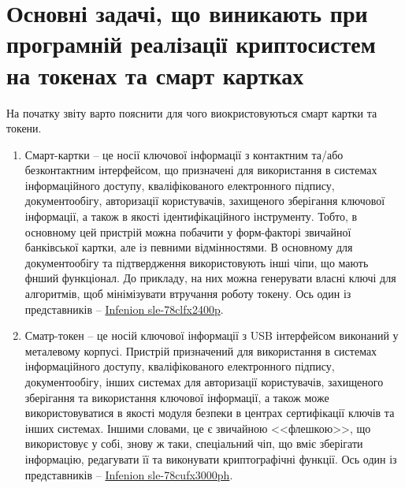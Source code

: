 


\chapter{Основні задачі, що виникають при програмній реалізації криптосистем на токенах та смарт картках}

На початку звіту варто пояснити для чого виокристовуються смарт картки та токени.
\begin{enumerate}
    \item Смарт-картки -- це носії ключової інформації з контактним та/або безконтактним інтерфейсом, що призначені для використання в системах інформаційного доступу, кваліфікованого електронного підпису, документообігу, авторизації користувачів, захищеного зберігання ключової інформації, а також в якості ідентифікаційного інструменту. Тобто, в основному цей пристрій можна побачити у форм-факторі звичайної банківської картки, але із певними відмінностями. В основному для документообігу та підтвердження використовують інші чіпи, що мають фнший функціонал. До прикладу, на них можна генерувати власні ключі для алгоритмів, щоб мінімізувати втручання роботу токену. Ось один із представників -- \href{https://www.infineon.com/cms/en/product/security-smart-card-solutions/security-controllers/contactless-and-dual-interface-security-controllers/sle-78clfx2400p/}{Infenion sle-78clfx2400p}.
    
    \item Сматр-токен -- це носій ключової інформації з USB інтерфейсом виконаний у металевому корпусі. Пристрій призначений для використання в системах інформаційного доступу, кваліфікованого електронного підпису, документообігу, інших системах для авторизації користувачів, захищеного зберігання та використання ключової інформації, а також може використовуватися в якості модуля безпеки в центрах сертифікації ключів та інших системах. Іншими словами, це є звичайною <<флешкою>>, що використовує у собі, знову ж таки, спеціальний чіп, що вміє зберігати інформацію, редагувати її та виконувати криптографічні функції. Ось один із представників -- \href{https://www.infineon.com/cms/en/product/security-smart-card-solutions/security-controllers/serial-interface-security-controllers/sle-78cufx3000ph/}{Infenion sle-78cufx3000ph}.
\end{enumerate}

